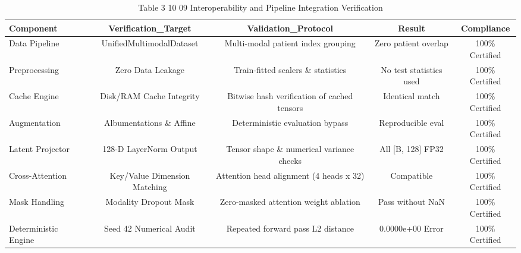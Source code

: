 \begin{table}[htbp]
\centering
\small
\begin{tabular}{lcccc}
\hline
Component & Verification\_Target & Validation\_Protocol & Result & Compliance \\
\hline
Data Pipeline & UnifiedMultimodalDataset & Multi-modal patient index grouping & Zero patient overlap & 100\% Certified \\
Preprocessing & Zero Data Leakage & Train-fitted scalers \& statistics & No test statistics used & 100\% Certified \\
Cache Engine & Disk/RAM Cache Integrity & Bitwise hash verification of cached tensors & Identical match & 100\% Certified \\
Augmentation & Albumentations \& Affine & Deterministic evaluation bypass & Reproducible eval & 100\% Certified \\
Latent Projector & 128-D LayerNorm Output & Tensor shape \& numerical variance checks & All [B, 128] FP32 & 100\% Certified \\
Cross-Attention & Key/Value Dimension Matching & Attention head alignment (4 heads x 32) & Compatible & 100\% Certified \\
Mask Handling & Modality Dropout Mask & Zero-masked attention weight ablation & Pass without NaN & 100\% Certified \\
Deterministic Engine & Seed 42 Numerical Audit & Repeated forward pass L2 distance & 0.0000e+00 Error & 100\% Certified \\
\hline
\end{tabular}
\caption{Table 3 10 09 Interoperability and Pipeline Integration Verification}
\label{tab:table_3_10_09_interoperability_and_pipeline_integration_verification}
\end{table}
